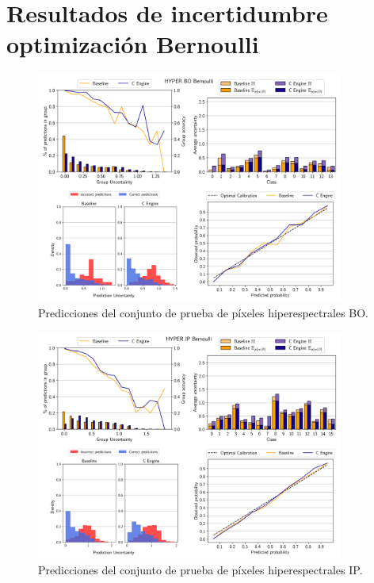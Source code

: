 \chapter{Resultados de incertidumbre optimización Bernoulli} \label{anx:bernoulli}

\begin{figure}[ht]
    \centering
    \includegraphics[width=0.9\textwidth]{root/Imagenes/anexo/Bernoulli-HYPER_BO-mosaic.png}
    \caption{Predicciones del conjunto de prueba de píxeles hiperespectrales BO.}
    \label{fig:anx-Bernoulli-HYPER_BO}
\end{figure}


\begin{figure}[ht]
    \centering
    \includegraphics[width=0.9\textwidth]{root/Imagenes/anexo/Bernoulli-HYPER_IP-mosaic.png}
    \caption{Predicciones del conjunto de prueba de píxeles hiperespectrales IP.}
    \label{fig:anx-Bernoulli-HYPER_IP}
\end{figure}


